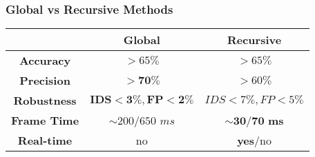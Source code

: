 \begin{frame}
	\frametitle{Global vs Recursive Methods}
	
	\Large
	
	\begin{center}
		\begin{table}[!t]
			\renewcommand{\arraystretch}{1.2}
			\setlength{\tabcolsep}{0.09cm}
			\begin{tabular}{ c | c | c | }
				\cline{2-3}
				& \textbf{Global} & \textbf{Recursive} \\ \hline			
				\multicolumn{1}{|c|}{\textbf{Accuracy}} & $ > 65\% $ & $ > 65\% $ \\ \hline
				\multicolumn{1}{|c|}{\textbf{Precision}} & $ \mathbf{> 70\%} $ & $ > 60\% $ \\
				\hline
				\multicolumn{1}{|c|}{\textbf{Robustness}} & $ \mathbf{IDS < 3\%}, \mathbf{FP < 2\%} $ &
				$ IDS < 7\%, FP < 5\% $ \\
				\hline
				\multicolumn{1}{|c|}{\textbf{Frame Time}} & $ \sim 200/650 $ $ ms $ &
				$ \mathbf{\boldsymbol{\sim} 30/70} $ \textbf{ms} \\ \hline
				\multicolumn{1}{|c|}{\textbf{Real-time}} & no & \textbf{yes}/no \\ \hline
			\end{tabular}
		\end{table}
	\end{center}
\end{frame}
